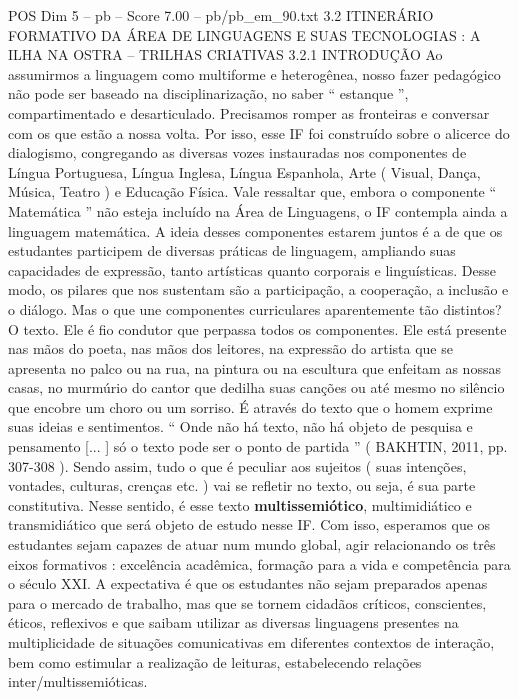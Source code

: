 \begin{textsample}{POS Dim 5 – pb – Score 7.00 – pb/pb\_em\_90.txt}  \label{ex:f5_pos_096}
3.2 ITINERÁRIO FORMATIVO DA ÁREA DE LINGUAGENS E SUAS TECNOLOGIAS : A ILHA NA OSTRA – TRILHAS CRIATIVAS 3.2.1 INTRODUÇÃO Ao assumirmos a linguagem como multiforme e heterogênea, nosso fazer pedagógico não pode ser baseado na disciplinarização, no saber “ estanque ”, compartimentado e desarticulado.
Precisamos romper as fronteiras e conversar com os que estão a nossa volta.
Por isso, esse IF foi construído sobre o alicerce do dialogismo, congregando as diversas vozes instauradas nos componentes de Língua Portuguesa, Língua Inglesa, Língua Espanhola, Arte ( Visual, Dança, Música, Teatro ) e Educação Física.
Vale ressaltar que, embora o componente “ Matemática ” não esteja incluído na Área de Linguagens, o IF contempla ainda a linguagem matemática.
A ideia desses componentes estarem juntos é a de que os estudantes participem de diversas práticas de linguagem, ampliando suas capacidades de expressão, tanto artísticas quanto corporais e linguísticas.
Desse modo, os pilares que nos sustentam são a participação, a cooperação, a inclusão e o diálogo.
Mas o que une componentes curriculares aparentemente tão distintos?
O texto.
Ele é fio condutor que perpassa todos os componentes.
Ele está presente nas mãos do poeta, nas mãos dos leitores, na expressão do artista que se apresenta no palco ou na rua, na pintura ou na escultura que enfeitam as nossas casas, no murmúrio do cantor que dedilha suas canções ou até mesmo no silêncio que encobre um choro ou um sorriso.
É através do texto que o homem exprime suas ideias e sentimentos. “ Onde não há texto, não há objeto de pesquisa e pensamento [... ] só o texto pode ser o ponto de partida ” ( BAKHTIN, 2011, pp. 307-308 ).
Sendo assim, tudo o que é peculiar aos sujeitos ( suas intenções, vontades, culturas, crenças etc. ) vai se refletir no texto, ou seja, é sua parte constitutiva.
Nesse sentido, é esse texto \textbf{multissemiótico}, multimidiático e transmidiático que será objeto de estudo nesse IF.
Com isso, esperamos que os estudantes sejam capazes de atuar num mundo global, agir relacionando os três eixos formativos : excelência acadêmica, formação para a vida e competência para o século XXI.
A expectativa é que os estudantes não sejam preparados apenas para o mercado de trabalho, mas que se tornem cidadãos críticos, conscientes, éticos, reflexivos e que saibam utilizar as diversas linguagens presentes na multiplicidade de situações comunicativas em diferentes contextos de interação, bem como estimular a realização de leituras, estabelecendo relações inter/multissemióticas.

\end{textsample}
